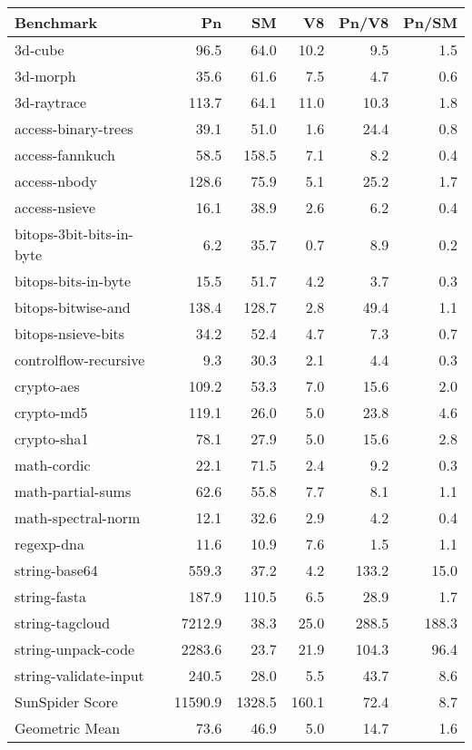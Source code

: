 \begin{tabular}{|l|r|r|r|r|r|}
  \hline
  Benchmark & Pn & SM & V8 & Pn/V8 & Pn/SM \\
  \hline \hline
  3d-cube & 96.5 & 64.0 & 10.2 & 9.5 & 1.5\\
  \hline
  3d-morph & 35.6 & 61.6 & 7.5 & 4.7 & 0.6\\
  \hline
  3d-raytrace & 113.7 & 64.1 & 11.0 & 10.3 & 1.8\\
  \hline
  access-binary-trees & 39.1 & 51.0 & 1.6 & 24.4 & 0.8\\
  \hline
  access-fannkuch & 58.5 & 158.5 & 7.1 & 8.2 & 0.4\\
  \hline
  access-nbody & 128.6 & 75.9 & 5.1 & 25.2 & 1.7\\
  \hline
  access-nsieve & 16.1 & 38.9 & 2.6 & 6.2 & 0.4\\
  \hline
  bitops-3bit-bits-in-byte & 6.2 & 35.7 & 0.7 & 8.9 & 0.2\\
  \hline
  bitops-bits-in-byte & 15.5 & 51.7 & 4.2 & 3.7 & 0.3\\
  \hline
  bitops-bitwise-and & 138.4 & 128.7 & 2.8 & 49.4 & 1.1\\
  \hline
  bitops-nsieve-bits & 34.2 & 52.4 & 4.7 & 7.3 & 0.7\\
  \hline
  controlflow-recursive & 9.3 & 30.3 & 2.1 & 4.4 & 0.3\\
  \hline
  crypto-aes & 109.2 & 53.3 & 7.0 & 15.6 & 2.0\\
  \hline
  crypto-md5 & 119.1 & 26.0 & 5.0 & 23.8 & 4.6\\
  \hline
  crypto-sha1 & 78.1 & 27.9 & 5.0 & 15.6 & 2.8\\
  \hline
  math-cordic & 22.1 & 71.5 & 2.4 & 9.2 & 0.3\\
  \hline
  math-partial-sums & 62.6 & 55.8 & 7.7 & 8.1 & 1.1\\
  \hline
  math-spectral-norm & 12.1 & 32.6 & 2.9 & 4.2 & 0.4\\
  \hline
  regexp-dna & 11.6 & 10.9 & 7.6 & 1.5 & 1.1\\
  \hline
  string-base64 & 559.3 & 37.2 & 4.2 & 133.2 & 15.0\\
  \hline
  string-fasta & 187.9 & 110.5 & 6.5 & 28.9 & 1.7\\
  \hline
  string-tagcloud & 7212.9 & 38.3 & 25.0 & 288.5 & 188.3\\
  \hline
  string-unpack-code & 2283.6 & 23.7 & 21.9 & 104.3 & 96.4\\
  \hline
  string-validate-input & 240.5 & 28.0 & 5.5 & 43.7 & 8.6\\
  \hline
  \hline
  SunSpider Score & 11590.9 & 1328.5 & 160.1 & 72.4 & 8.7\\
  Geometric Mean & 73.6 & 46.9 & 5.0 & 14.7 & 1.6\\
  \hline
\end{tabular}
